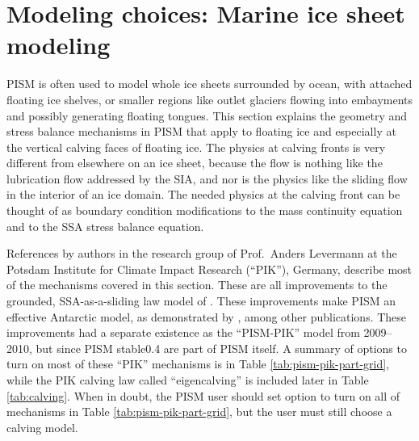 
\section{Modeling choices: Marine ice sheet modeling}
\label{sec:pism-pik}

PISM is often used to model whole ice sheets surrounded by ocean, with attached floating ice shelves, or smaller regions like outlet glaciers flowing into embayments and possibly generating floating tongues.  This section explains the geometry and stress balance mechanisms in PISM that apply to floating ice and especially at the vertical calving faces of floating ice.  The physics at calving fronts is very different from elsewhere on an ice sheet, because the flow is nothing like the lubrication flow addressed by the SIA, and nor is the physics like the sliding flow in the interior of an ice domain.  The needed physics at the calving front can be thought of as boundary condition modifications to the mass continuity equation and to the SSA stress balance equation.

References \cite{Albrechtetal2011,Levermannetal2012,Winkelmannetal2011} by authors in the research group of Prof.~Anders Levermann at the Potsdam Institute for Climate Impact Research (``PIK''), Germany, describe most of the mechanisms covered in this section.  These are all improvements to the grounded, SSA-as-a-sliding law model of \cite{BBssasliding}.  These improvements make PISM an effective Antarctic model, as demonstrated by \cite{Golledgeetal2013,Martinetal2011,Winkelmannetal2012}, among other publications.  These improvements had a separate existence as the ``PISM-PIK'' model from 2009--2010, but since PISM stable0.4 are part of PISM itself.  A summary of options to turn on most of these ``PIK'' mechanisms is in Table \ref{tab:pism-pik-part-grid}, while the PIK calving law called ``eigencalving'' \cite{Levermannetal2012} is included later in Table \ref{tab:calving}.  When in doubt, the PISM user should set option  to turn on all of mechanisms in Table \ref{tab:pism-pik-part-grid}, but the user must still choose a calving model.

